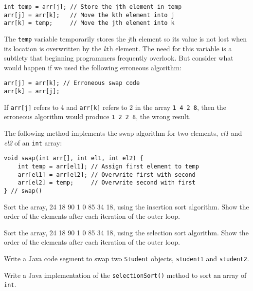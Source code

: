 \begin{jjjlisting}
\begin{lstlisting}
int temp = arr[j]; // Store the jth element in temp
arr[j] = arr[k];   // Move the kth element into j
arr[k] = temp;     // Move the jth element into k
\end{lstlisting}
\end{jjjlisting}

\noindent The {\tt temp} variable temporarily stores the {\em j}th
element so its value is not lost when its location is overwritten by
the {\em k}th element. The need for this variable is a subtlety that
beginning programmers frequently overlook. But consider what would
happen if we used the following erroneous algorithm:

\begin{jjjlisting}
\begin{lstlisting}
arr[j] = arr[k]; // Erroneous swap code
arr[k] = arr[j];
\end{lstlisting}
\end{jjjlisting}

\noindent If {\tt arr[j]} refers to 4 and {\tt arr[k]} refers to 2 in
the array \mbox{{\tt 1 4 2 8}}, then the erroneous algorithm would
produce \mbox{{\tt 1 2 2 8}}, the wrong result.  



\noindent The following method implements the swap algorithm for two
elements, {\it el1} and {\it el2} of an {\tt int} array:

\begin{jjjlisting}
\begin{lstlisting}
void swap(int arr[], int el1, int el2) {
    int temp = arr[el1]; // Assign first element to temp
    arr[el1] = arr[el2]; // Overwrite first with second
    arr[el2] = temp;     // Overwrite second with first
} // swap()
\end{lstlisting}
\end{jjjlisting}

\label{self-study-exercises}
\begin{SSTUDY}

\item Sort the array, 24 18 90 1 0 85 34 18, using the insertion sort
algorithm.  Show the order of the elements after each iteration of the
outer loop.

\item Sort the array, 24 18 90 1 0 85 34 18, using the selection sort
algorithm.  Show the order of the elements after each iteration of the
outer loop.

\item  Write a Java code segment to swap two {\tt Student} objects,
{\tt student1} and {\tt student2}.

\item Write a Java implementation of the {\tt selectionSort()} method to 
sort an array of {\tt int}.
\end{SSTUDY}

